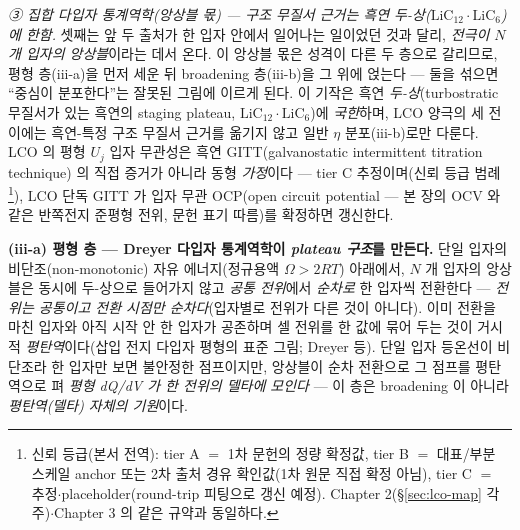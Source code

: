 \emph{③ 집합 다입자 통계역학(앙상블 몫) --- 구조 무질서 근거는 흑연 두-상($\mathrm{LiC_{12}}\cdot\mathrm{LiC_6}$)에 한함.} 셋째는 앞 두 출처가
한 입자 안에서 일어나는 일이었던 것과 달리, \emph{전극이 $N$ 개 입자의 앙상블}이라는 데서 온다. 이 앙상블 몫은 성격이
다른 두 층으로 갈리므로, 평형 층(iii-a)을 먼저 세운 뒤 broadening 층(iii-b)을 그 위에 얹는다 --- 둘을 섞으면 ``중심이
분포한다''는 잘못된 그림에 이르게 된다. 이 기작은 흑연 \emph{두-상}(turbostratic 무질서가 있는 흑연의 staging
plateau, $\mathrm{LiC_{12}}\cdot\mathrm{LiC_6}$)에 \emph{국한}하며, LCO 양극의 세 전이에는 흑연-특정 구조 무질서
근거를 옮기지 않고 일반 $\eta$ 분포(iii-b)로만 다룬다. LCO 의 평형 $U_j$ 입자 무관성은 흑연
GITT(galvanostatic intermittent titration technique)\cite{park2021} 의 직접 증거가 아니라 동형
\emph{가정}이다 --- tier C 추정이며(신뢰 등급 범례\footnote{신뢰 등급(본서 전역): tier A $=$ 1차 문헌의 정량 확정값, tier B $=$ 대표/부분 스케일 anchor 또는 2차 출처 경유 확인값(1차 원문 직접 확정 아님), tier C $=$ 추정$\cdot$placeholder(round-trip 피팅으로 갱신 예정). Chapter 2(\S\ref{sec:lco-map} 각주)$\cdot$Chapter 3 의 같은 규약과 동일하다.}), LCO 단독 GITT 가 입자
무관 OCP(open circuit potential --- 본 장의 OCV 와 같은 반쪽전지 준평형 전위, 문헌 표기 따름)를
확정하면 갱신한다.

\textbf{(iii-a) 평형 층 --- Dreyer 다입자 통계역학이 \emph{plateau 구조}를 만든다.} 단일 입자의 비단조(non-monotonic) 자유
에너지(정규용액 $\Omega>2RT$) 아래에서, $N$ 개 입자의 앙상블은 동시에 두-상으로 들어가지 않고 \emph{공통 전위}에서
\emph{순차로} 한 입자씩 전환한다 --- \emph{전위는 공통이고 전환 시점만 순차다}(입자별로 전위가 다른 것이 아니다). 이미
전환을 마친 입자와 아직 시작 안 한 입자가 공존하며 셀 전위를 한 값에 묶어 두는
것이 거시적 \emph{평탄역}이다(삽입 전지 다입자 평형의 표준 그림; Dreyer 등\cite{dreyer2010,dreyer2011}).
단일 입자 등온선이 비단조라 한 입자만 보면 불안정한 점프이지만, 앙상블이 순차 전환으로 그 점프를
평탄역으로 펴 \emph{평형 dQ/dV 가 한 전위의 델타에 모인다} --- 이 층은 broadening 이 아니라 \emph{평탄역(델타) 자체의 기원}이다.


